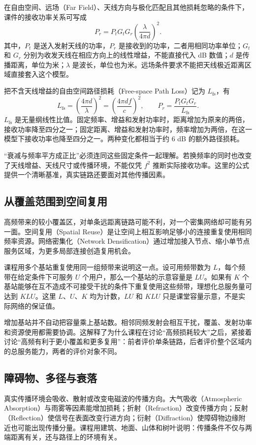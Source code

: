 在自由空间、远场（Far Field）、天线方向与极化匹配且其他损耗忽略的条件下，课件的接收功率关系可写成
\begin{equation}
P_r=P_tG_tG_r\left(\frac{\lambda}{4\pi d}\right)^2.
\end{equation}
其中，$P_t$ 是送入发射天线的功率，$P_r$ 是接收到的功率，二者用相同功率单位；$G_t$ 和 $G_r$ 分别为收发天线在相应方向上的线性增益，不能直接代入 dB 数值；$d$ 是传播距离，单位为米；$\lambda$ 是波长，单位也为米。远场条件要求不能把天线极近距离区域直接套入这个模型。

把不含天线增益的自由空间路径损耗（Free-space Path Loss）记为 $L_{\mathrm{fs}}$，有
\begin{equation}
L_{\mathrm{fs}}=\left(\frac{4\pi d}{\lambda}\right)^2
=\left(\frac{4\pi df}{c}\right)^2,
\qquad P_r=\frac{P_tG_tG_r}{L_{\mathrm{fs}}}.
\end{equation}
$L_{\mathrm{fs}}$ 是无量纲线性比值。固定频率、增益和发射功率时，距离增加为原来的两倍，接收功率降至四分之一；固定距离、增益和发射功率时，频率增加为两倍，在这一模型下接收功率也降至四分之一。两种变化都相当于约 $6$ dB 的额外路径损耗。

“衰减与频率平方成正比”必须连同这些固定条件一起理解。若换频率的同时也改变了天线增益、天线尺寸或传播环境，不能仅凭 $f^2$ 推断实际接收功率。这里的公式提供一个清晰基准，真实链路还要面对其他传播因素。

\subsection{从覆盖范围到空间复用}
高频带来的较小覆盖区，对单条远距离链路可能不利，对一个密集网络却可能有另一面。空间复用（Spatial Reuse）是让空间上相互影响足够小的连接重复使用相同频率资源。网络密集化（Network Densification）通过增加接入节点、缩小单节点服务区域，为更多局部连接创造复用机会。

课程用多个基站重复使用同一组频带来说明这一点。设可用频带数为 $L$，每个频带在给定条件下可服务 $U$ 个用户，那么一个基站的示意容量是 $LU$。如果有 $K$ 个基站能够在互不造成不可接受干扰的条件下重复使用这些频带，理想化总服务量可达到 $KLU$。这里 $L$、$U$、$K$ 均为计数，$LU$ 和 $KLU$ 只是课堂容量示意，不是实际网络的保证值。

增加基站并不自动把容量乘上基站数。相邻同频发射会相互干扰，覆盖、发射功率和资源使用都需要协调。这解释了为什么课程在讨论“高频损耗较大”之后，紧接着讨论“高频有利于更小覆盖和更多复用”：前者评价单条链路，后者评价整个区域内的总服务能力，两者的评价对象不同。

\subsection{障碍物、多径与衰落}
真实传播环境会吸收、散射或改变电磁波的传播方向。大气吸收（Atmospheric Absorption）与雨雾等因素能增加损耗；折射（Refraction）改变传播方向；反射（Reflection）使信号在表面改变行进方向；衍射（Diffraction）使障碍物边缘附近也可能出现传播分量。课程用建筑、地面、山体和树叶说明：传播条件不仅与两端距离有关，还与路径上的环境有关。

